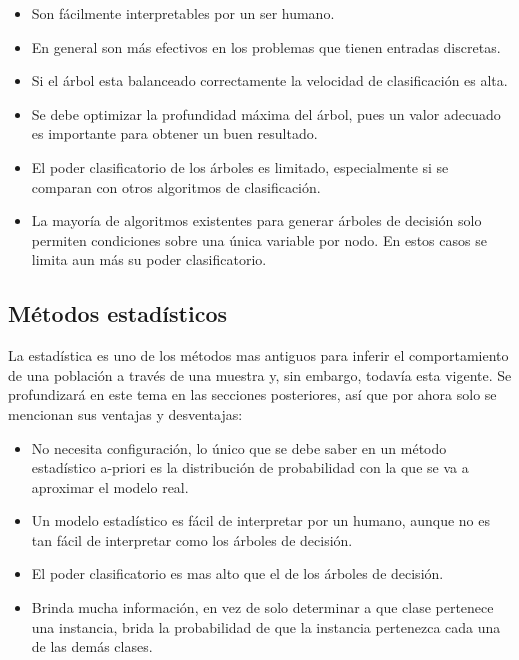 \documentclass[a4paper, 11pt, oneside]{report}
\begin{document}
	\begin{itemize}
	
	\item Son fácilmente interpretables por un ser humano.

	\item En general son más efectivos en los problemas que tienen entradas discretas.
	
	\item Si el árbol esta balanceado correctamente la velocidad de clasificación es alta.
	
	\item Se debe optimizar la profundidad máxima del árbol, pues un valor adecuado es importante para obtener un buen resultado.
	
	\item El poder clasificatorio de los árboles es limitado, especialmente si se comparan con otros algoritmos de clasificación.
	
	\item La mayoría de algoritmos existentes para generar árboles de decisión solo permiten condiciones sobre una única variable por nodo. En estos casos se limita aun más su poder clasificatorio. 

	\end{itemize}

\subsection{Métodos estadísticos}

La estadística es uno de los métodos mas antiguos para inferir el comportamiento de una población a través de una muestra y, sin embargo, todavía esta vigente. Se profundizará en este tema en las secciones posteriores, así que por ahora solo se mencionan sus ventajas y desventajas:

	\begin{itemize}

	\item No necesita configuración, lo único que se debe saber en un método estadístico a-priori es la distribución de probabilidad con la que se va a aproximar el modelo real.

	\item Un modelo estadístico es fácil de interpretar por un humano, aunque no es tan fácil de interpretar como los árboles de decisión.

	\item El poder clasificatorio es mas alto que el de los árboles de decisión.

	\item Brinda mucha información, en vez de solo determinar a que clase pertenece una instancia, brida la probabilidad de que la instancia pertenezca cada una de las demás clases.
	
	\end{itemize}
	
\end{document}
